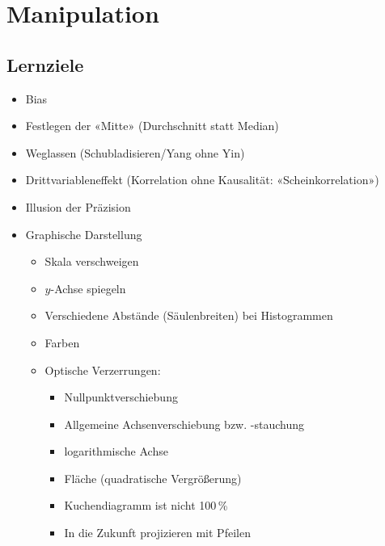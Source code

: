 
\section{Manipulation}

\subsection*{Lernziele}

\begin{itemize}
\item Bias%
\item Festlegen der «Mitte» (Durchschnitt statt Median)%
\item Weglassen (Schubladisieren/Yang ohne Yin)
\item Drittvariableneffekt (Korrelation ohne Kausalität: «Scheinkorrelation»)
\item Illusion der Präzision
\item Graphische Darstellung %
  \begin{itemize}
  \item Skala verschweigen
  \item $y$-Achse spiegeln
  \item Verschiedene Abstände (Säulenbreiten) bei Histogrammen
  \item Farben
  \item Optische Verzerrungen:
    \begin{itemize}
    \item Nullpunktverschiebung
    \item Allgemeine Achsenverschiebung bzw. -stauchung
    \item logarithmische Achse
    \item Fläche (quadratische Vergrößerung)
    \item Kuchendiagramm ist nicht 100\,\%
    \item In die Zukunft projizieren mit Pfeilen
    \end{itemize}
  \end{itemize}
\end{itemize}

